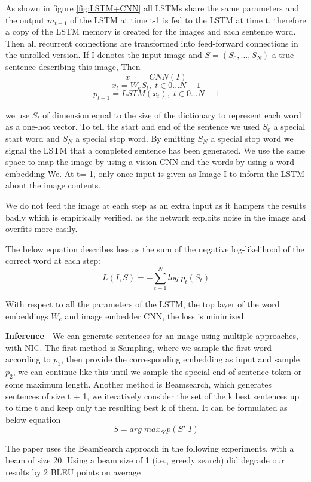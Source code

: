 \documentclass[a4paper,UKenglish,cleveref, autoref, thm-restate]{lipics-v2021}
\begin{document}
As shown in figure \ref{fig:LSTM+CNN} all LSTMs share the same parameters and the output $m_{t-1}$ of the LSTM at time t-1 is fed to the LSTM at time t, therefore a copy of the LSTM memory is created for the images and each sentence word. Then all recurrent connections are transformed into feed-forward connections in the unrolled version.
If I denotes the input image and $S = (S_{0}, . . . , S_{N} )$ a true sentence describing this image,
Then
\[ x_{-1} = CNN(I) \label{eq:equation10} \tag{10} \]
\[ x_{t} = W_{e}S_{t},\; t \in {0 . . . N-1} \label{eq:equation11} \tag{11}\]
\[ p_{t+1} = LSTM(x_{t}),\; t \in {0 . . . N-1} \label{eq:equation12} \tag{12}
\]

we use $S_{t}$ of dimension equal to the size of the dictionary to represent each word as a one-hot vector.
To tell the start and end of the sentence we used $S_{0}$ a special start word and $S_{N}$ a special stop word. By emitting $S_{N}$ a special stop word we signal the LSTM that a completed sentence has been generated.
We use the same space to map the image by using a vision CNN and the words by using a word embedding We.
At t=-1, only once input is given as Image I to inform the LSTM about the image contents.

We do not feed the image at each step as an extra input as it hampers the results badly which is empirically verified, as the network exploits noise in the image and overfits more easily.

The below equation describes loss as the sum of the negative log-likelihood of the correct word at each step:
\[ L(I,S) = -\sum_{t-1}^{N} log\; p_{t}(S_{t})
\label{eq:equation13} \tag{13} \]

With respect to all the parameters of the LSTM, the top layer of the word embeddings $W_{e}$ and image embedder CNN, the loss is minimized.

\textbf{Inference} -
We can generate sentences for an image using multiple approaches, with NIC.  The first method is Sampling, where we sample the first word according to $p_{1}$, then provide the corresponding embedding as input and sample $p_{2}$, we can continue like this until we sample the special end-of-sentence token or some maximum length.
Another method is Beamsearch, which generates sentences of size t + 1, we iteratively consider the set of the k best sentences up to time t and keep only the resulting best k of them.
It can be formulated as below equation
\[
S = arg\; max_{S'} p(S' |I)
\]

The paper uses the BeamSearch approach in the following experiments, with a beam of size 20. Using a beam size of 1 (i.e., greedy search) did degrade our results by 2 BLEU points on average
\end{document}
